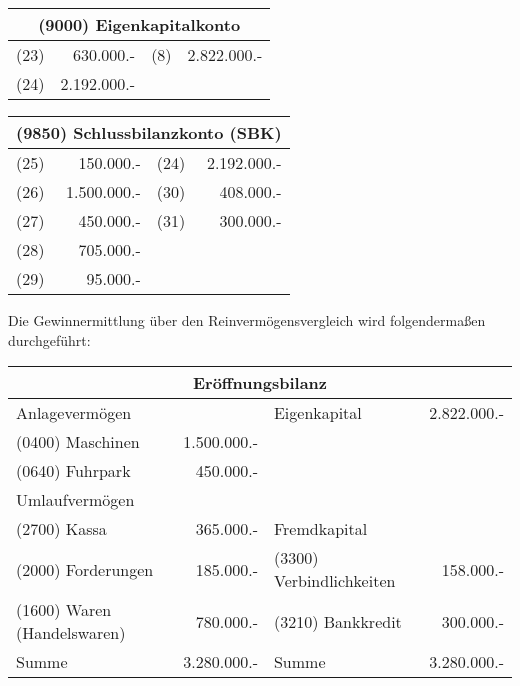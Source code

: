 \documentclass[parskip=half,12pt,a4paper]{scrartcl}
\begin{document}
\begin{center}
\begin{tabular}{lr|lr}
	\multicolumn{4}{c}{(9000) Eigenkapitalkonto}\\
	\toprule
	(23) & 630.000.- & (8) & 2.822.000.-\\
	(24) & 2.192.000.- & &\\
	\bottomrule
\end{tabular}
\end{center}

\begin{center}
\begin{tabular}{lr|lr}
\multicolumn{4}{c}{(9850) Schlussbilanzkonto (SBK)}\\
\toprule
	(25) & 150.000.- & (24) & 2.192.000.-\\
	(26) & 1.500.000.- & (30) & 408.000.-\\
	(27) & 450.000.- & (31) & 300.000.-\\
	(28) & 705.000.- & &\\
	(29) & 95.000.- & &\\
	\bottomrule
\end{tabular}
\end{center}

Die Gewinnermittlung über den Reinvermögensvergleich wird folgendermaßen durchgeführt:

\begin{center}
	\begin{tabular}{lr|lr}
		\multicolumn{4}{c}{Eröffnungsbilanz}\\
		\toprule
		Anlagevermögen & & Eigenkapital & 2.822.000.-\\
		(0400) Maschinen & 1.500.000.- & &\\
		(0640) Fuhrpark & 450.000.- & &\\
		Umlaufvermögen & & &\\
		(2700) Kassa & 365.000.- & Fremdkapital &\\
		(2000) Forderungen & 185.000.- & (3300) Verbindlichkeiten & 158.000.-\\
		(1600) Waren (Handelswaren) & 780.000.- & (3210) Bankkredit & 300.000.-\\
		\bottomrule
		Summe & 3.280.000.- & Summe & 3.280.000.-\\
	\end{tabular}
\end{center}
\end{document}
